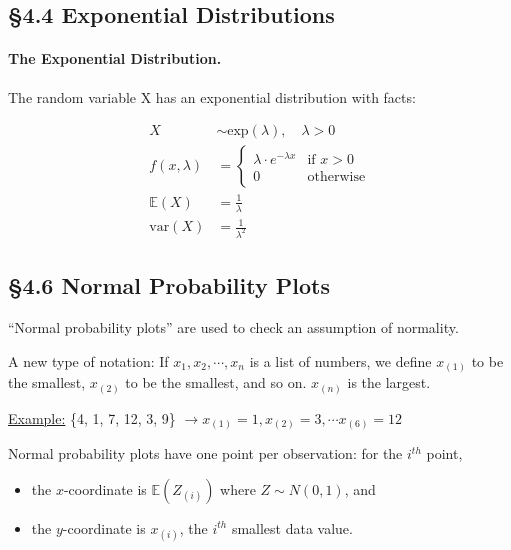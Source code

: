 \documentclass[../Notes.tex]{subfiles}
\begin{document}
    \subsection*{\S 4.4 Exponential Distributions}

    \paragraph*{The Exponential Distribution.} The random variable X has an exponential distribution with facts:

    \begin{align}
        X               & \sim \text{exp}(\lambda), \quad \lambda > 0                       \\
        f(x, \lambda)   & =
                                \begin{cases}
                                    \lambda\cdot e^{-\lambda x} & \text{if } x > 0          \\
                                    0   & \text{otherwise}
                                \end{cases}                                                 \\
        \mathbb{E}(X)   & = \frac{1}{\lambda}                                               \\
        \text{var}(X)   & = \frac{1}{\lambda^{2}}                                           
    \end{align}

    \subsection*{\S 4.6 Normal Probability Plots}

    ``Normal probability plots'' are used to check an assumption of normality.

    A new type of notation: If $x_{1}, x_{2}, \cdots, x_{n}$ is a list of numbers, we define $x_{(1)}$ to be the smallest, $x_{(2)}$ to be the smallest, and so on. $x_{(n)}$ is the largest.

    \underline{Example:} \{4, 1, 7, 12, 3, 9\} $\rightarrow x_{(1)} = 1, x_{(2)} = 3, \cdots x_{(6)} = 12$

    Normal probability plots have one point per observation: for the $i^{th}$ point,
    \begin{itemize}
        \item the $x$-coordinate is $\mathbb{E}(Z_{(i)})$ where $Z \sim N(0,1)$, and
        \item the $y$-coordinate is $x_{(i)}$, the $i^{th}$ smallest data value.
    \end{itemize}
\end{document}
